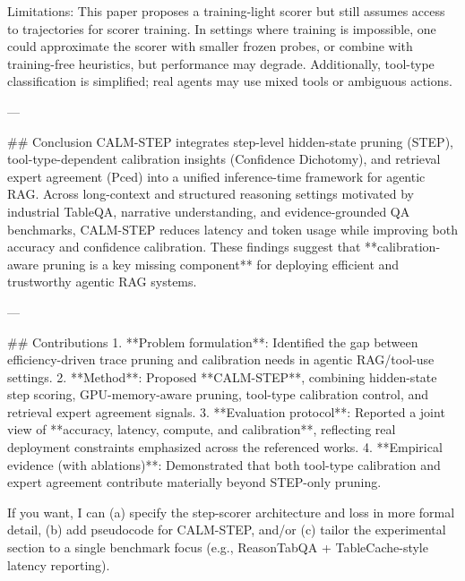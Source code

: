 Limitations: This paper proposes a training-light scorer but still assumes access to trajectories for scorer training. In settings where training is impossible, one could approximate the scorer with smaller frozen probes, or combine with training-free heuristics, but performance may degrade. Additionally, tool-type classification is simplified; real agents may use mixed tools or ambiguous actions.

---

## Conclusion  
CALM-STEP integrates step-level hidden-state pruning (STEP), tool-type-dependent calibration insights (Confidence Dichotomy), and retrieval expert agreement (Pced) into a unified inference-time framework for agentic RAG. Across long-context and structured reasoning settings motivated by industrial TableQA, narrative understanding, and evidence-grounded QA benchmarks, CALM-STEP reduces latency and token usage while improving both accuracy and confidence calibration. These findings suggest that **calibration-aware pruning is a key missing component** for deploying efficient and trustworthy agentic RAG systems.

---

## Contributions  
1. **Problem formulation**: Identified the gap between efficiency-driven trace pruning and calibration needs in agentic RAG/tool-use settings.  
2. **Method**: Proposed **CALM-STEP**, combining hidden-state step scoring, GPU-memory-aware pruning, tool-type calibration control, and retrieval expert agreement signals.  
3. **Evaluation protocol**: Reported a joint view of **accuracy, latency, compute, and calibration**, reflecting real deployment constraints emphasized across the referenced works.  
4. **Empirical evidence (with ablations)**: Demonstrated that both tool-type calibration and expert agreement contribute materially beyond STEP-only pruning.

If you want, I can (a) specify the step-scorer architecture and loss in more formal detail, (b) add pseudocode for CALM-STEP, and/or (c) tailor the experimental section to a single benchmark focus (e.g., ReasonTabQA + TableCache-style latency reporting).